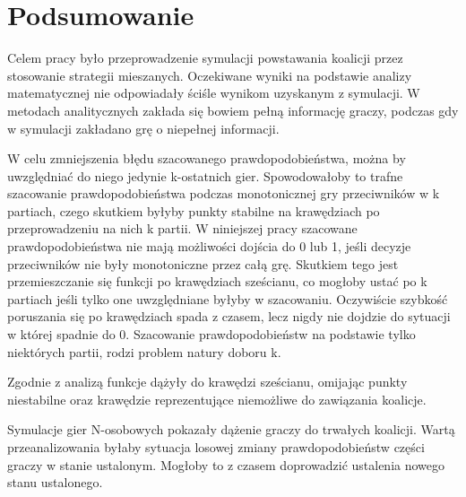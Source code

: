 \chapter{Podsumowanie}
\label{cha:podsumowanie}

Celem pracy było przeprowadzenie symulacji  powstawania koalicji przez stosowanie strategii mieszanych. Oczekiwane wyniki na podstawie analizy matematycznej nie odpowiadały ściśle wynikom uzyskanym z symulacji. W metodach analitycznych zakłada się bowiem pełną informację graczy, podczas gdy w symulacji zakładano grę o niepełnej informacji. 

W celu zmniejszenia błędu szacowanego prawdopodobieństwa, można by uwzględniać do niego jedynie k-ostatnich gier. Spowodowałoby to trafne szacowanie prawdopodobieństwa podczas monotonicznej gry przeciwników w k partiach, czego skutkiem byłyby punkty stabilne na krawędziach po przeprowadzeniu na nich k partii. W niniejszej pracy szacowane prawdopodobieństwa nie mają możliwości dojścia do 0 lub 1, jeśli decyzje przeciwników nie były monotoniczne przez całą grę. Skutkiem tego jest przemieszczanie się funkcji po krawędziach sześcianu, co mogłoby ustać po k partiach jeśli tylko one uwzględniane byłyby w szacowaniu. Oczywiście szybkość poruszania się po krawędziach spada z czasem, lecz nigdy nie dojdzie do sytuacji w której spadnie do 0. Szacowanie prawdopodobieństw na podstawie tylko niektórych partii, rodzi problem natury doboru k. 

Zgodnie z analizą funkcje dążyły do krawędzi sześcianu, omijając punkty niestabilne oraz krawędzie reprezentujące niemożliwe do zawiązania koalicje.

Symulacje gier N-osobowych pokazały dążenie graczy do trwałych koalicji. Wartą przeanalizowania byłaby sytuacja losowej zmiany prawdopodobieństw części graczy w stanie ustalonym. Mogłoby to z czasem doprowadzić ustalenia nowego stanu ustalonego.
